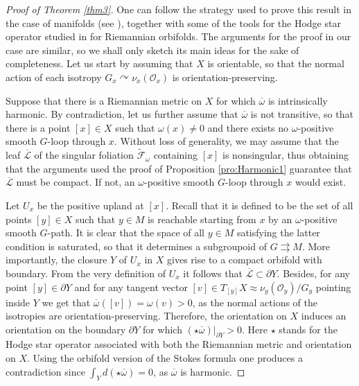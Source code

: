\documentclass[
  a4paper, 
  reqno, 
  oneside, 
  12pt
]{amsart}
\theoremstyle{definition}
\theoremstyle{remark}
\newcommand{\rr}{\rightrightarrows}
\begin{document}
\begin{proof}[Proof of Theorem \ref{thm3}]
One can follow the strategy used to prove this result in the case of manifolds (see \cite[Thm. 9.11]{F}), together with some of the tools for the Hodge star operator studied in \cite{Chian,FarProSea} for Riemannian orbifolds. The arguments for the proof in our case are similar, so we shall only sketch its main ideas for the sake of completeness. Let us start by assuming that $X$ is orientable, so that the normal action of each isotropy $G_x\curvearrowright \nu_x(\mathcal{O}_x)$ is orientation-preserving. 


Suppose that there is a Riemannian metric on $X$ for which $\overline{\omega}$ is intrinsically harmonic. By contradiction, let us further assume that $\overline{\omega}$ is not transitive, so that there is a point $[x]\in X$ such that $\omega(x)\neq 0$ and there exists no $\omega$-positive smooth $G$-loop through $x$. Without loss of generality, 
we may assume that the leaf $\overline{\mathcal{L}}$ of the singular foliation $\tilde{\mathcal{F}}_\omega$ containing $[x]$ is nonsingular, thus obtaining that the arguments used the proof of Proposition \ref{pro:Harmonic1} guarantee that $\overline{\mathcal{L}}$ must be compact. If not, an $\omega$-positive smooth $G$-loop through $x$ would exist. 

Let $U_x$ be the positive upland at $[x]$. Recall that it is defined to be the set of all points $[y]\in X$ such that $y\in M$ is reachable starting from $x$ by an $\omega$-positive smooth $G$-path. It is clear that the space of all $y\in M$ satisfying the latter condition is saturated, so that it determines a subgroupoid of $G\rr M$. More importantly, the closure $Y$ of $U_x$ in $X$ gives rise to a compact orbifold with boundary. From the very definition of $U_x$ it follows that $\overline{\mathcal{L}}\subset \partial Y$. Besides, for any point $[y]\in \partial Y$ and for any tangent vector $[v]\in T_{[y]}X\approx \nu_y(\mathcal{O}_y)/G_y$ pointing inside $Y$ we get that $\overline{\omega}([v])=\omega(v)>0$, as the normal actions of the isotropies are orientation-preserving. Therefore, the orientation on $X$ induces an orientation on the boundary $\partial Y$ for which $(\star \overline{\omega})|_{\partial Y}>0$. Here $\star$ stands for the Hodge star operator associated with both the Riemannian metric and orientation on $X$. Using the orbifold version of the Stokes formula one produces a contradiction since $\int_{Y}d(\star \overline{\omega})=0$, as $\overline{\omega}$ is harmonic. 


\end{proof}
\end{document}
